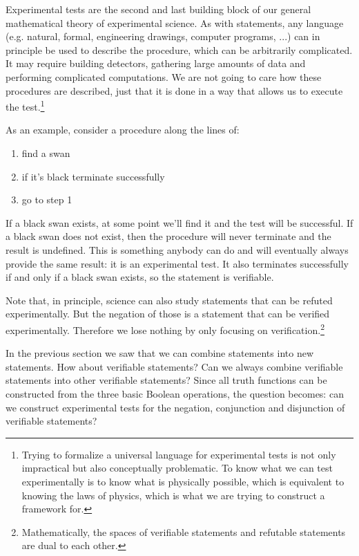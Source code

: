 \documentclass[11pt,letterpaper,fleqn]{memoir} %
\begin{document}
Experimental tests are the second and last building block of our general mathematical theory of experimental science. As with statements, any language (e.g. natural, formal, engineering drawings, computer programs, ...) can in principle be used to describe the procedure, which can be arbitrarily complicated. It may require building detectors, gathering large amounts of data and performing complicated computations. We are not going to care how these procedures are described, just that it is done in a way that allows us to execute the test.\footnote{Trying to formalize a universal language for experimental tests is not only impractical but also conceptually problematic. To know what we can test experimentally is to know what is physically possible, which is equivalent to knowing the laws of physics, which is what we are trying to construct a framework for.}

As an example, consider a procedure along the lines of:
\begin{enumerate}
	\item find a swan
	\item if it's black terminate successfully
	\item go to step 1
\end{enumerate}
If a black swan exists, at some point we'll find it and the test will be successful. If a black swan does not exist, then the procedure will never terminate and the result is undefined. This is something anybody can do and will eventually always provide the same result: it is an experimental test. It also terminates successfully if and only if a black swan exists, so the statement  is verifiable.

Note that, in principle, science can also study statements that can be refuted experimentally. But the negation of those is a statement that can be verified experimentally. Therefore we lose nothing by only focusing on verification.\footnote{Mathematically, the spaces of verifiable statements and refutable statements are dual to each other.}

In the previous section we saw that we can combine statements into new statements. How about verifiable statements? Can we always combine verifiable statements into other verifiable statements? Since all truth functions can be constructed from the three basic Boolean operations, the question becomes: can we construct experimental tests for the negation, conjunction and disjunction of verifiable statements?
\end{document}
